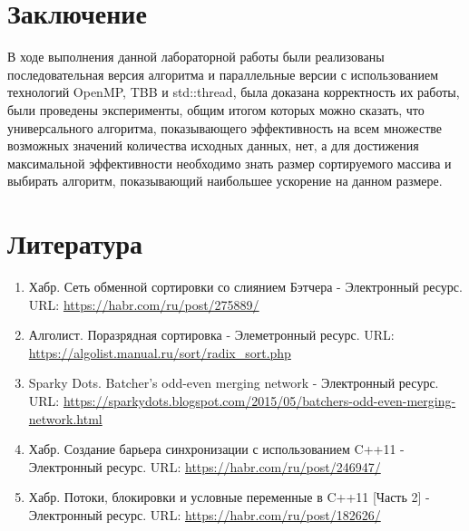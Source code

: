 \documentclass{report}
\begin{document}
\newpage

\section*{Заключение}
\par В ходе выполнения данной лабораторной работы были реализованы последовательная версия алгоритма и параллельные версии с использованием технологий OpenMP, TBB и std::thread, была доказана корректность их работы, были проведены эксперименты, общим итогом которых можно сказать, что универсального алгоритма, показывающего эффективность на всем множестве возможных значений количества исходных данных, нет, а для достижения максимальной эффективности необходимо знать размер сортируемого массива и выбирать алгоритм, показывающий наибольшее ускорение на данном размере. 

\newpage

\section*{Литература}
\begin{enumerate}
    \item Хабр. Сеть обменной сортировки со слиянием Бэтчера - Электронный ресурс. URL: \newline
    \url{https://habr.com/ru/post/275889/}
    \item Алголист. Поразрядная сортировка - Элеметронный ресурс. URL: \newline
    \url{https://algolist.manual.ru/sort/radix_sort.php}
    \item Sparky Dots. Batcher's odd-even merging network - Электронный ресурс. URL: \newline
    \url{https://sparkydots.blogspot.com/2015/05/batchers-odd-even-merging-network.html}
    \item Хабр. Создание барьера синхронизации с использованием C++11 - Электронный ресурс. URL: \newline
    \url{https://habr.com/ru/post/246947/}
    \item Хабр. Потоки, блокировки и условные переменные в C++11 [Часть 2] - Электронный ресурс. URL: \newline
    \url{https://habr.com/ru/post/182626/}
\end{enumerate}
\newpage

\end{document}
